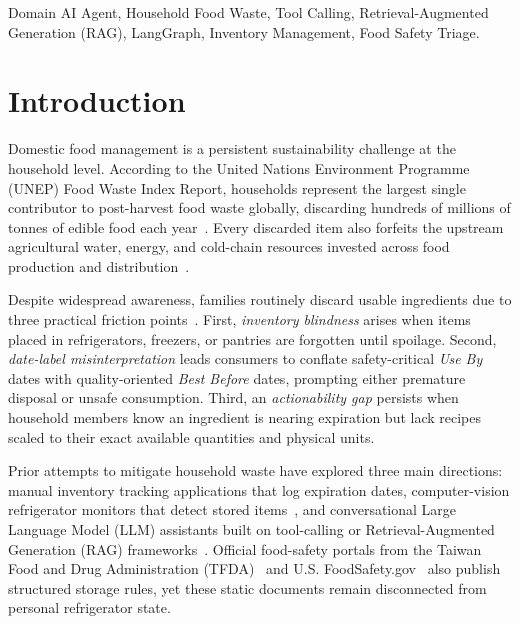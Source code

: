 \documentclass[conference]{IEEEtran}
\begin{document}
\begin{IEEEkeywords}
Domain AI Agent, Household Food Waste, Tool Calling, Retrieval-Augmented Generation (RAG), LangGraph, Inventory Management, Food Safety Triage.
\end{IEEEkeywords}

\section{Introduction}

Domestic food management is a persistent sustainability challenge at the household level. According to the United Nations Environment Programme (UNEP) Food Waste Index Report, households represent the largest single contributor to post-harvest food waste globally, discarding hundreds of millions of tonnes of edible food each year~\cite{unep2024}. Every discarded item also forfeits the upstream agricultural water, energy, and cold-chain resources invested across food production and distribution~\cite{fao2019}.

Despite widespread awareness, families routinely discard usable ingredients due to three practical friction points~\cite{tfda_date,foodsafety_4steps}. First, \emph{inventory blindness} arises when items placed in refrigerators, freezers, or pantries are forgotten until spoilage. Second, \emph{date-label misinterpretation} leads consumers to conflate safety-critical \emph{Use By} dates with quality-oriented \emph{Best Before} dates, prompting either premature disposal or unsafe consumption. Third, an \emph{actionability gap} persists when household members know an ingredient is nearing expiration but lack recipes scaled to their exact available quantities and physical units.

Prior attempts to mitigate household waste have explored three main directions: manual inventory tracking applications that log expiration dates, computer-vision refrigerator monitors that detect stored items~\cite{schick2023toolformer}, and conversational Large Language Model (LLM) assistants built on tool-calling or Retrieval-Augmented Generation (RAG) frameworks~\cite{yao2023react,lewis2020rag}. Official food-safety portals from the Taiwan Food and Drug Administration (TFDA)~\cite{tfda_freeze,tfda_date} and U.S. FoodSafety.gov~\cite{foodsafety_4steps,foodsafety_charts} also publish structured storage rules, yet these static documents remain disconnected from personal refrigerator state.
\end{document}
